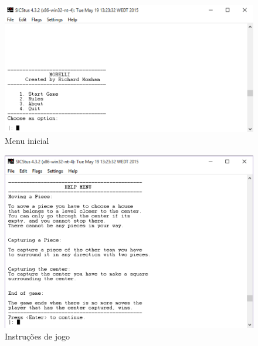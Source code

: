 \documentclass[a4paper]{article}
\begin{document}
\begin{figure}[h!]
\begin{center}
\hspace*{-0.5cm}\includegraphics[scale=1]{menu1.png}
\caption{Menu inicial}
\end{center}
\end{figure}

\begin{figure}[h!]
\begin{center}
\hspace*{-0.5cm}\includegraphics[scale=0.83]{helpmenu.png}
\caption{Instruções de jogo}
\end{center}
\end{figure}
\end{document}
